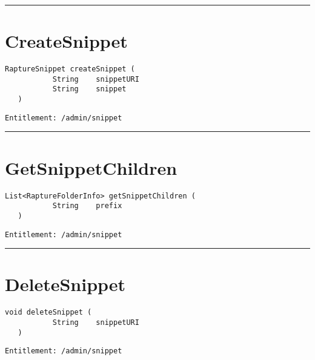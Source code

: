 \rule{12cm}{2pt}
\section{CreateSnippet}
\label{Api:CreateSnippet}
\begin{lstlisting}[style=nonumbers]
   RaptureSnippet createSnippet (
           String    snippetURI
           String    snippet
   )
\end{lstlisting}
\begin{Verbatim}[formatcom=\color{Maroon}]
  Entitlement: /admin/snippet
\end{Verbatim}



\rule{12cm}{2pt}
\section{GetSnippetChildren}
\label{Api:GetSnippetChildren}
\begin{lstlisting}[style=nonumbers]
   List<RaptureFolderInfo> getSnippetChildren (
           String    prefix
   )
\end{lstlisting}
\begin{Verbatim}[formatcom=\color{Maroon}]
  Entitlement: /admin/snippet
\end{Verbatim}



\rule{12cm}{2pt}
\section{DeleteSnippet}
\label{Api:DeleteSnippet}
\begin{lstlisting}[style=nonumbers]
   void deleteSnippet (
           String    snippetURI
   )
\end{lstlisting}
\begin{Verbatim}[formatcom=\color{Maroon}]
  Entitlement: /admin/snippet
\end{Verbatim}



